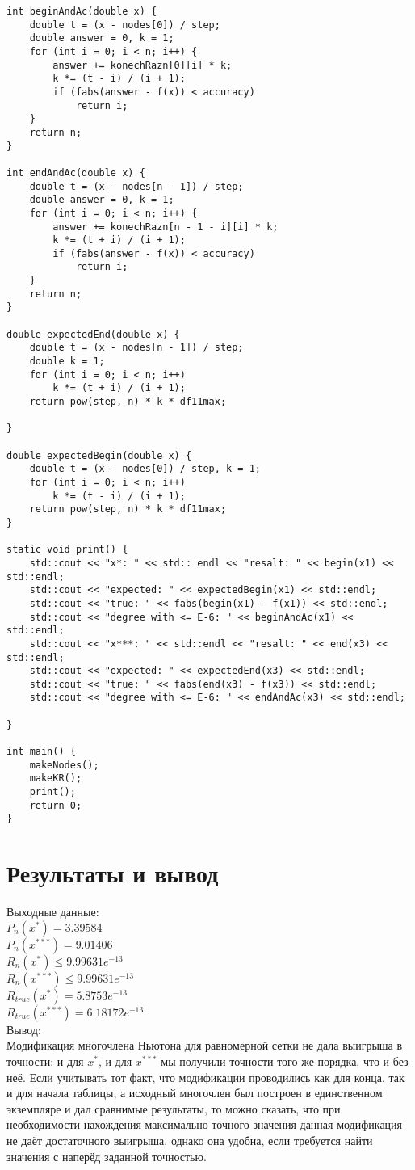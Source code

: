\documentclass[10pt]{scrartcl}
\begin{document}
\begin{verbatim}
int beginAndAc(double x) {
    double t = (x - nodes[0]) / step;
    double answer = 0, k = 1;
    for (int i = 0; i < n; i++) {
        answer += konechRazn[0][i] * k;
        k *= (t - i) / (i + 1);
        if (fabs(answer - f(x)) < accuracy)
            return i;
    }
    return n;
}

int endAndAc(double x) {
    double t = (x - nodes[n - 1]) / step;
    double answer = 0, k = 1;
    for (int i = 0; i < n; i++) {
        answer += konechRazn[n - 1 - i][i] * k;
        k *= (t + i) / (i + 1);
        if (fabs(answer - f(x)) < accuracy)
            return i;
    }
    return n;
}

double expectedEnd(double x) {
    double t = (x - nodes[n - 1]) / step;
    double k = 1;
    for (int i = 0; i < n; i++)
        k *= (t + i) / (i + 1);
    return pow(step, n) * k * df11max;

}

double expectedBegin(double x) {
    double t = (x - nodes[0]) / step, k = 1;
    for (int i = 0; i < n; i++)
        k *= (t - i) / (i + 1);
    return pow(step, n) * k * df11max;
}

static void print() {
    std::cout << "x*: " << std:: endl << "resalt: " << begin(x1) << std::endl;
    std::cout << "expected: " << expectedBegin(x1) << std::endl;
    std::cout << "true: " << fabs(begin(x1) - f(x1)) << std::endl;
    std::cout << "degree with <= E-6: " << beginAndAc(x1) << std::endl;
    std::cout << "x***: " << std::endl << "resalt: " << end(x3) << std::endl;
    std::cout << "expected: " << expectedEnd(x3) << std::endl;
    std::cout << "true: " << fabs(end(x3) - f(x3)) << std::endl;
    std::cout << "degree with <= E-6: " << endAndAc(x3) << std::endl;

}

int main() {
    makeNodes();
    makeKR();
    print();
    return 0;
}
\end{verbatim}
\section*{Результаты и вывод}\noindent
Выходные данные:\\
$P_n(x^*) = 3.39584$\\
$P_n(x^{***})= 9.01406$\\
$R_n(x^*) \leq 9.99631e^{-13}$\\
$R_n(x^{***}) \leq 9.99631e^{-13}$\\
$R_{true}(x^*) = 5.8753e^{-13}$\\
$R_{true}(x^{***}) = 6.18172e^{-13}$\\
Вывод:\\
Модификация многочлена Ньютона для равномерной сетки не дала выигрыша в точности: и для $x^*$, и для $x^{***}$ мы получили точности того же порядка, что и без неё. Если учитывать тот факт, что модификации проводились как для конца, так и для начала таблицы, а исходный многочлен был построен в единственном экземпляре и дал сравнимые результаты, то можно сказать, что при
необходимости нахождения максимально точного значения данная модификация не даёт достаточного выигрыша, однако она удобна, если требуется найти значения с наперёд заданной точностью.
\end{document}
